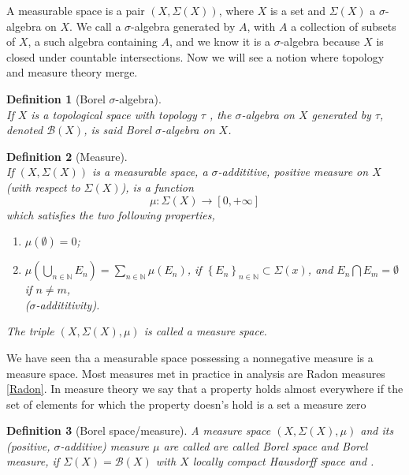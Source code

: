 \documentclass[a4paper,11pt]{article} %
\numberwithin{equation}{section} %
\numberwithin{figure}{section} %
\newtheorem{dfn}{Definition}
\begin{document}
A measurable space \cite[Def. 1.30, p. 16]{Moretti2012} is a pair $(X, \Sigma(X))$, where $X$ is a set and $\Sigma(X)$ a $\sigma$-algebra on $X$.
We call a $\sigma$-algebra generated by $A$, with $A$ a collection of subsets of $X$, a such algebra containing $A$, and we know it is a $\sigma$-algebra because $X$ is closed under countable intersections. Now we will see a notion where topology and measure theory merge.

\begin{dfn}[Borel $\sigma$-algebra] \cite[Def. 1.32, p. 17]{Moretti2012} \\
If $X$ is a topological space \cite[Def. 1.1, p. 10]{Moretti2012} with topology $\tau$ \cite[Def. 1.1, p. 10]{Moretti2012}, the $\sigma$-algebra on $X$ generated by $\tau$, denoted $\mathcal{B}(X)$, is said Borel $\sigma$-algebra on $X$.
\end{dfn}

\begin{dfn}[Measure] \cite[Def. 1.39, p. 19]{Moretti2012} \\
If $(X, \Sigma(X))$ is a measurable space, a $\sigma$-addititive, positive measure on $X$ (with respect to $\Sigma(X)$), is a function 
\begin{equation}
\mu : \Sigma(X) \to [0,+\infty] 
\end{equation}
which satisfies the two following properties,
\begin{enumerate}
\item $\mu(\emptyset) = 0$;
\item $\mu( \underset{n \in \mathbb{N}}{\bigcup} E_n ) = \underset{n \in \mathbb{N}}{\sum} \mu(E_n)$, if $\left\{E_n\right\}_{n\in\mathbb{N}} \subset \Sigma(x)$, and $E_n \bigcap E_m = \emptyset$ if $n\neq m$,\\ ($\sigma$-addititivity).
\end{enumerate}
The triple $(X,\Sigma(X),\mu)$ is called a measure space.
\end{dfn}

We have seen tha a measurable space possessing a nonnegative measure is a measure space. Most measures met in practice in analysis are Radon measures \ref{Radon}. In measure theory we say that a property holds almost everywhere if the set of elements for which the property doesn's hold is a set a measure zero \cite[Def. 1.46, p.21]{Moretti2012}

\begin{dfn}[Borel space/measure] \cite[Def. 1.42, p. 20]{Moretti2012}
 A measure space $(X, \Sigma(X), \mu)$ and its (positive, $\sigma$-additive) measure $\mu$ are called are called Borel space and Borel measure, if $\Sigma(X) = \mathcal{B}(X)$ with $X$ locally compact Hausdorff space \cite[Def. 1.19, p. 14]{Moretti2012} and \cite[Def. 1.3, p. 10]{Moretti2012}.
\end{dfn}
\end{document}
